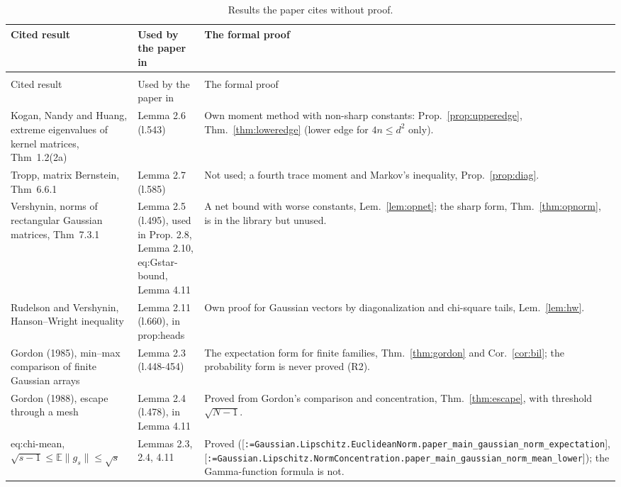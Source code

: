 \documentclass[11pt]{article}
\makeatletter
\newcommand{\formal@break}[1]{\@tfor\formal@tok:=#1\do{%
  \formal@tok
  \expandafter\ifx\formal@tok.\allowbreak\else
  \expandafter\ifx\formal@tok\_\allowbreak\fi\fi}}
\DeclareRobustCommand{\formal}[1]{\textnormal{[\texttt{\small\formal@break{#1}}]}}
\newcommand{\E}{\mathbb{E}}
\newcommand{\norm}[1]{\lVert #1\rVert}
\theoremstyle{plain}
\theoremstyle{definition}
\makeatother
\begin{document}
\begingroup\footnotesize\setlength{\tabcolsep}{3pt}\renewcommand{\arraystretch}{1.15}
\makeatletter\renewcommand{\formal}[1]{\textnormal{[\texttt{\formal@break{#1}}]}}\makeatother
\begin{longtable}{@{}>{\raggedright\arraybackslash}p{42mm}>{\raggedright\arraybackslash}p{32mm}>{\raggedright\arraybackslash}p{72mm}@{}}
\caption{Results the paper cites without proof.}\label{tab:cited}\\
\hline
Cited result & Used by the paper in & The formal proof\\
\hline
\endfirsthead
\multicolumn{3}{@{}l}{\small\emph{Table~\ref{tab:cited}, continued.}}\\
\hline
Cited result & Used by the paper in & The formal proof\\
\hline
\endhead
\hline
\endfoot
\hline
\endlastfoot
Kogan, Nandy and Huang, extreme eigenvalues of kernel matrices, Thm~1.2(2a) & Lemma 2.6 (l.543) & Own moment method with non-sharp constants: Prop.~\ref{prop:upperedge}, Thm.~\ref{thm:loweredge} (lower edge for $4n \le d^2$ only).\\
Tropp, matrix Bernstein, Thm~6.6.1 & Lemma 2.7 (l.585) & Not used; a fourth trace moment and Markov's inequality, Prop.~\ref{prop:diag}.\\
Vershynin, norms of rectangular Gaussian matrices, Thm~7.3.1 & Lemma 2.5 (l.495), used in Prop. 2.8, Lemma 2.10, eq:Gstar-bound, Lemma 4.11 & A net bound with worse constants, Lem.~\ref{lem:opnet}; the sharp form, Thm.~\ref{thm:opnorm}, is in the library but unused.\\
Rudelson and Vershynin, Hanson--Wright inequality & Lemma 2.11 (l.660), in prop:heads & Own proof for Gaussian vectors by diagonalization and chi-square tails, Lem.~\ref{lem:hw}.\\
Gordon (1985), min--max comparison of finite Gaussian arrays & Lemma 2.3 (l.448-454) & The expectation form for finite families, Thm.~\ref{thm:gordon} and Cor.~\ref{cor:bil}; the probability form is never proved (R2).\\
Gordon (1988), escape through a mesh & Lemma 2.4 (l.478), in Lemma 4.11 & Proved from Gordon's comparison and concentration, Thm.~\ref{thm:escape}, with threshold $\sqrt{N-1}$.\\
eq:chi-mean, $\sqrt{s-1} \le \E\norm{g_s} \le \sqrt s$ & Lemmas 2.3, 2.4, 4.11 & Proved (\formal{Gaussian.Lipschitz.EuclideanNorm.paper\_main\_gaussian\_norm\_expectation}, \formal{Gaussian.Lipschitz.NormConcentration.paper\_main\_gaussian\_norm\_mean\_lower}); the Gamma-function formula is not.\\

\end{longtable}
\end{document}
